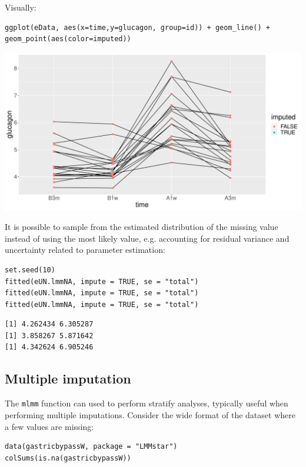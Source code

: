 \documentclass[12pt]{article}
\begin{document}
Visually:
\lstset{language=r,label= ,caption= ,captionpos=b,numbers=none}
\begin{lstlisting}
ggplot(eData, aes(x=time,y=glucagon, group=id)) + geom_line() + geom_point(aes(color=imputed))
\end{lstlisting}

\begin{center}
\includegraphics[trim={0 0 0 0},width=1\textwidth]{./figures/imputation.pdf}
\end{center}

It is possible to sample from the estimated distribution of the
missing value instead of using the most likely value, e.g. accounting
for residual variance and uncertainty related to parameter estimation:
\lstset{language=r,label= ,caption= ,captionpos=b,numbers=none}
\begin{lstlisting}
set.seed(10)
fitted(eUN.lmmNA, impute = TRUE, se = "total")
fitted(eUN.lmmNA, impute = TRUE, se = "total")
fitted(eUN.lmmNA, impute = TRUE, se = "total")
\end{lstlisting}

\begin{verbatim}
[1] 4.262434 6.305287
[1] 3.858267 5.871642
[1] 4.342624 6.905246
\end{verbatim}


\clearpage

\subsection{Multiple imputation}
\label{sec:org8817c6e}

The \texttt{mlmm} function can used to perform stratify analyses, typically
useful when performing multiple imputations. Consider the wide format
of the dataset where a few values are missing:
\lstset{language=r,label= ,caption= ,captionpos=b,numbers=none}
\begin{lstlisting}
data(gastricbypassW, package = "LMMstar")
colSums(is.na(gastricbypassW))
\end{lstlisting}
\end{document}
